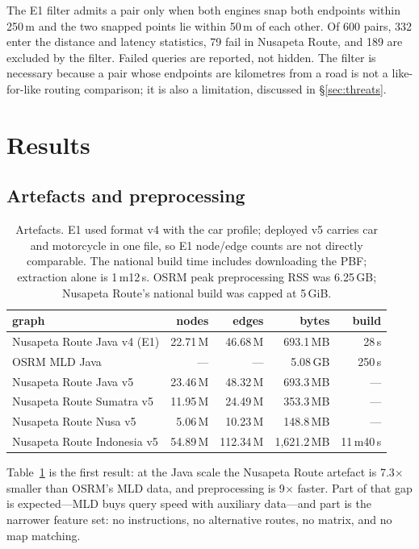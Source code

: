 \documentclass[sigconf,nonacm]{acmart}
\begin{document}
The E1 filter admits a pair only when both engines snap both endpoints within
250\,m and the two snapped points lie within 50\,m of each other. Of 600 pairs,
332 enter the distance and latency statistics, 79 fail in Nusapeta Route, and 189 are
excluded by the filter. Failed queries are reported, not hidden. The filter is
necessary because a pair whose endpoints are kilometres from a road is not a
like-for-like routing comparison; it is also a limitation, discussed in
\S\ref{sec:threats}.

\section{Results}
\subsection{Artefacts and preprocessing}
\begin{table}[t]
\small
\begin{tabular}{@{}lrrrr@{}}
\toprule
graph & nodes & edges & bytes & build \\
\midrule
Nusapeta Route Java v4 (E1) & 22.71\,M & 46.68\,M & 693.1\,MB & 28\,s \\
OSRM MLD Java        & ---      & ---      & 5.08\,GB  & 250\,s \\
Nusapeta Route Java v5      & 23.46\,M & 48.32\,M & 693.3\,MB & --- \\
Nusapeta Route Sumatra v5   & 11.95\,M & 24.49\,M & 353.3\,MB & --- \\
Nusapeta Route Nusa v5      &  5.06\,M & 10.23\,M & 148.8\,MB & --- \\
Nusapeta Route Indonesia v5 & 54.89\,M & 112.34\,M & 1{,}621.2\,MB & 11\,m40\,s \\
\bottomrule
\end{tabular}
\caption{Artefacts. E1 used format v4 with the car profile; deployed v5 carries
car and motorcycle in one file, so E1 node/edge counts are not directly
comparable. The national build time includes downloading the PBF; extraction
alone is 1\,m12\,s. OSRM peak preprocessing RSS was 6.25\,GB; Nusapeta Route's national
build was capped at 5\,GiB.}
\label{tab:artefacts}
\end{table}

Table~\ref{tab:artefacts} is the first result: at the Java scale the Nusapeta Route
artefact is 7.3$\times$ smaller than OSRM's MLD data, and preprocessing is
9$\times$ faster. Part of that gap is expected---MLD buys query speed with
auxiliary data---and part is the narrower feature set: no instructions, no
alternative routes, no matrix, and no map matching.
\end{document}
